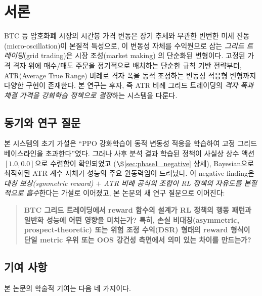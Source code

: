 \documentclass[11pt, a4paper]{article}
\begin{document}
\newpage
\tableofcontents
\newpage

\section{서론}
\label{sec:intro}

BTC 등 암호화폐 시장의 시간봉 가격 변동은 장기 추세와 무관한 빈번한 미세 진동
(micro-oscillation)이 본질적 특성으로, 이 변동성 자체를 수익원으로 삼는
\emph{그리드 트레이딩}(grid trading)은 시장 조성(market making)
\citep{avellaneda2008market}의 단순화된 변형이다. 고정된 가격 격자 위에 매수/매도
주문을 정기적으로 배치하는 단순한 규칙 기반 전략부터, ATR(Average True Range)
\citep{wilder1978atr} 비례로 격자 폭을 동적 조정하는 변동성 적응형 변형까지 다양한
구현이 존재한다. 본 연구는 후자, 즉 ATR 비례 그리드 트레이딩의 \emph{격자 폭과
체결 가격을 강화학습 정책으로 결정}하는 시스템을 다룬다.

\subsection{동기와 연구 질문}
\label{sec:intro_motivation}

본 시스템의 초기 가설은 ``PPO 강화학습이 동적
변동성 적응을 학습하여 고정 그리드 베이스라인을 초과한다''였다. 그러나 사후 분석
결과 학습된 정책이 사실상 상수 액션 $[1.0, 0.0]$으로 수렴함이 확인되었고
($\S$\ref{sec:phase1_negative} 상세), Bayesian으로 최적화된 ATR 계수 자체가 성능의
주요 원동력임이 드러났다. 이 negative finding은 \emph{대칭 보상(symmetric reward)
$+$ ATR 비례 공식의 조합이 RL 정책의 자유도를 본질적으로 흡수}한다는 가설로 이어졌고,
본 논문의 새 연구 질문으로 이어진다:

\begin{quote}
\textbf{BTC 그리드 트레이딩에서 reward 함수의 설계가 RL 정책의 행동 패턴과 일반화
성능에 어떤 영향을 미치는가? 특히, 손실 비대칭(asymmetric, prospect-theoretic) 또는
위험 조정 수익(DSR) 형태의 reward 형식이 단일 metric 우위 또는 OOS
강건성 측면에서 의미 있는 차이를 만드는가?}
\end{quote}

\subsection{기여 사항}
\label{sec:intro_contribution}

본 논문의 학술적 기여는 다음 네 가지이다.
\end{document}

